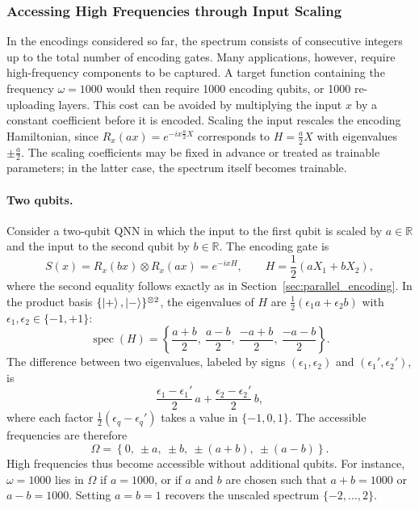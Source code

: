 \documentclass[12pt]{article}
\numberwithin{equation}{section}  %
\begin{document}
\subsubsection{Accessing High Frequencies through Input Scaling}
\label{sec:input_scaling}

In the encodings considered so far, the spectrum consists of consecutive integers up to the total number of encoding gates. Many applications, however, require high-frequency components to be captured. A target function containing the frequency $\omega = 1000$ would then require 1000 encoding qubits, or 1000 re-uploading layers. This cost can be avoided by multiplying the input $x$ by a constant coefficient before it is encoded. Scaling the input rescales the encoding Hamiltonian, since $R_x(ax) = e^{-ix\frac{a}{2}X}$ corresponds to $H = \frac{a}{2}X$ with eigenvalues $\pm\frac{a}{2}$. The scaling coefficients may be fixed in advance or treated as trainable parameters; in the latter case, the spectrum itself becomes trainable.

\paragraph{Two qubits.} Consider a two-qubit QNN in which the input to the first qubit is scaled by $a \in \mathbb{R}$ and the input to the second qubit by $b \in \mathbb{R}$. The encoding gate is
\begin{equation}
S(x) = R_x(bx) \otimes R_x(ax) = e^{-ixH}, \qquad
H = \frac{1}{2}\left(a X_1 + b X_2\right),
\end{equation}
where the second equality follows exactly as in Section~\ref{sec:parallel_encoding}. In the product basis $\{\ket{+},\ket{-}\}^{\otimes 2}$, the eigenvalues of $H$ are $\frac{1}{2}(\epsilon_1 a + \epsilon_2 b)$ with $\epsilon_1, \epsilon_2 \in \{-1, +1\}$:
\begin{equation}
\operatorname{spec}(H) = \left\{ \frac{a+b}{2},\ \frac{a-b}{2},\ \frac{-a+b}{2},\ \frac{-a-b}{2} \right\}.
\end{equation}
The difference between two eigenvalues, labeled by signs $(\epsilon_1, \epsilon_2)$ and $(\epsilon_1', \epsilon_2')$, is
\begin{equation}
\frac{\epsilon_1 - \epsilon_1'}{2}\, a + \frac{\epsilon_2 - \epsilon_2'}{2}\, b,
\end{equation}
where each factor $\frac{1}{2}(\epsilon_q - \epsilon_q')$ takes a value in $\{-1, 0, 1\}$. The accessible frequencies are therefore
\begin{equation}
\Omega = \left\{ 0,\ \pm a,\ \pm b,\ \pm(a+b),\ \pm(a-b) \right\}.
\end{equation}
High frequencies thus become accessible without additional qubits. For instance, $\omega = 1000$ lies in $\Omega$ if $a = 1000$, or if $a$ and $b$ are chosen such that $a + b = 1000$ or $a - b = 1000$. Setting $a = b = 1$ recovers the unscaled spectrum $\{-2, \ldots, 2\}$.
\end{document}

